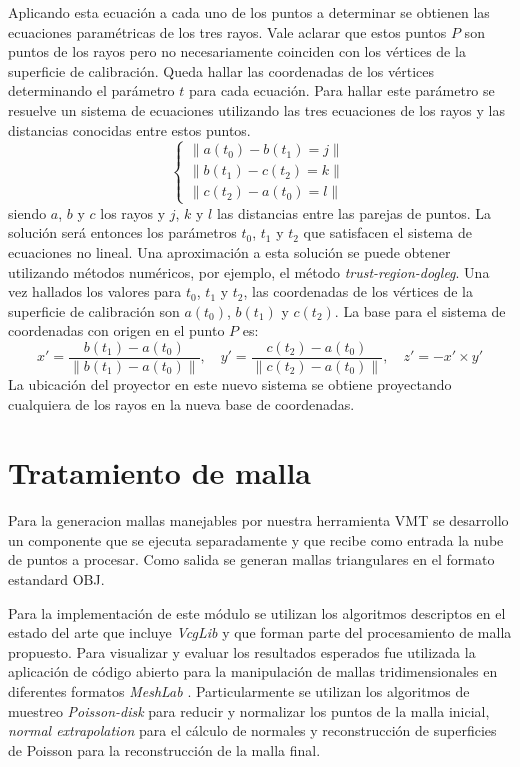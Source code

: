 Aplicando esta ecuación a cada uno de los puntos a determinar se obtienen las ecuaciones paramétricas de los tres rayos. Vale aclarar que estos puntos $P$ son puntos de los rayos pero no necesariamente coinciden con los vértices de la superficie de calibración. Queda hallar las coordenadas de los vértices determinando el parámetro $t$ para cada ecuación. Para hallar este parámetro se resuelve un sistema de ecuaciones utilizando las tres ecuaciones de los rayos y las distancias conocidas entre estos puntos.
\[
\begin{cases}
\lVert{a(t_0) - b(t_1)} = j\rVert \\
\lVert{b(t_1) - c(t_2)} = k\rVert \\
\lVert{c(t_2) - a(t_0)} = l\rVert
\end{cases}
\]
siendo $a$, $b$ y $c$ los rayos y $j$, $k$ y $l$ las distancias entre las parejas de puntos.
La solución será entonces los parámetros $t_0$, $t_1$ y $t_2$ que satisfacen el sistema de ecuaciones no lineal.
Una aproximación a esta solución se puede obtener utilizando métodos numéricos, por ejemplo, el método \emph{trust-region-dogleg}\cite{TrustRegionDogleg}.
Una vez hallados los valores para $t_0$, $t_1$ y $t_2$, las coordenadas de los vértices de la superficie de calibración son $a(t_0)$, $b(t_1)$ y $c(t_2)$.
La base para el sistema de coordenadas con origen en el punto $P$ es:
\[
x' = \frac{b(t_1) - a(t_0)}{\lVert b(t_1) - a(t_0) \rVert},\quad y' = \frac{c(t_2) - a(t_0)}{\lVert c(t_2) - a(t_0)\rVert},\quad z' = -x' \times y'
\]
La ubicación del proyector en este nuevo sistema se obtiene proyectando cualquiera de los rayos en la nueva base de coordenadas.

\section{Tratamiento de malla}

Para la generacion mallas manejables por nuestra herramienta VMT se desarrollo un componente que se ejecuta separadamente y que recibe como entrada la nube de puntos a procesar. Como salida se generan mallas triangulares en el formato estandard OBJ.

Para la implementación de este módulo se utilizan los algoritmos descriptos en el estado del arte que incluye \emph{VcgLib} y que forman parte del procesamiento de malla propuesto. Para visualizar y evaluar los resultados esperados fue utilizada la aplicación de código abierto para la manipulación de mallas tridimensionales en diferentes formatos \emph{MeshLab} \cite{MeshLab}. Particularmente se utilizan los algoritmos de muestreo \emph{Poisson-disk} para reducir y normalizar los puntos de la malla inicial, \emph{normal extrapolation} para el cálculo de normales y reconstrucción de superficies de Poisson para la reconstrucción de la malla final.

